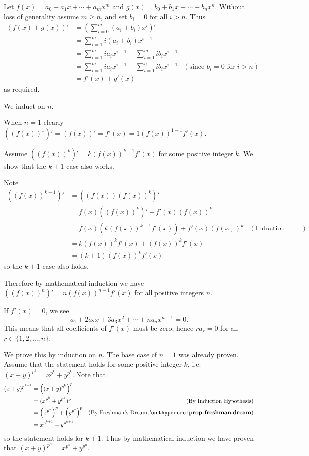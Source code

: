 \begin{questions}
    \item Let $f(x) = a_0 + a_1x + \cdots + a_mx^m$ and $g(x) = b_0 + b_1x + \cdots + b_nx^n$. Without loss of generality assume $m \geq n$, and set $b_i = 0$ for all $i > n$. Thus
    \begin{align*}
        (f(x) + g(x))' &= \left(\sum_{i=0}^m(a_i + b_i)x^i\right)'\\
        &= \sum_{i=1}^m i(a_i+b_i)x^{i-1}\\
        &= \sum_{i=1}^m ia_ix^{i-1} + \sum_{i=1}^m ib_ix^{i-1}\\
        &= \sum_{i=1}^m ia_ix^{i-1} + \sum_{i=1}^n ib_ix^{i-1} & (\text{since } b_i = 0 \text{ for } i > n)\\
        &= f'(x) + g'(x)
    \end{align*}
    as required.

    \item We induct on $n$.

    When $n = 1$ clearly $((f(x))^1)' = (f(x))' = f'(x) = 1(f(x))^{1-1}f'(x)$.

    Assume $((f(x))^k)' = k(f(x))^{k-1}f'(x)$ for some positive integer $k$. We show that the $k+1$ case also works.

    Note
    \begin{align*}
        ((f(x))^{k+1})' &= ((f(x))(f(x))^k)'\\
        &= f(x)((f(x))^k)' + f'(x)(f(x))^k\\
        &= f(x)(k(f(x))^{k-1}f'(x)) + f'(x)(f(x))^k & (\text{Induction Hypothesis})\\
        &= k(f(x))^kf'(x) + (f(x))^kf'(x)\\
        &= (k+1)(f(x))^kf'(x)
    \end{align*}
    so the $k+1$ case also holds.

    Therefore by mathematical induction we have $((f(x))^n)' = n(f(x))^{n-1}f'(x)$ for all positive integers $n$.

    \item If $f'(x) = 0$, we see
    \[
        a_1 + 2a_2x + 3a_3x^2 + \cdots + na_nx^{n-1} = 0.
    \]
    This means that all coefficients of $f'(x)$ must be zero; hence $ra_r = 0$ for all $r \in \{1, 2, \dots, n\}$.

    \item We prove this by induction on $n$. The base case of $n = 1$ was already proven. Assume that the statement holds for some positive integer $k$, i.e. $(x+y)^{p^k} = x^{p^k} + y^{p^k}$. Note that
    \begin{align*}
        (x+y)^{p^{k+1}} &= \left((x+y)^{p^k}\right)^p\\
        &= (x^{p^k}+y^{p^k})^p & (\text{By Induction Hypothesis})\\
        &= \left(x^{p^k}\right)^p + \left(y^{p^k}\right)^p & (\text{By Freshman's Dream}, \myref{prop-freshman-dream})\\
        &= x^{p^{k+1}} + y^{p^{k+1}}
    \end{align*}
    so the statement holds for $k + 1$. Thus by mathematical induction we have proven that $(x+y)^{p^n} = x^{p^n} + y^{p^n}$.
\end{questions}

